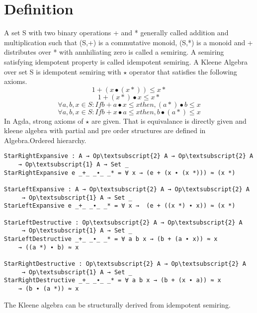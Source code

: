 \section{Definition}
A set S with two binary operations + and * generally called addition and multiplication such that (S,+) is a commutative monoid, (S,*) is a monoid and + distributes over * with annhiliating zero is called a semiring. A semiring satisfying idempotent property is called idempotent semiring. A Kleene Algebra over set S is idempotent semiring with \( \star \) operator that satisfies the following axioms.
\begin{equation}\label{eq_starrightexpansive}
1 + (x ∙ (x *)) \leq x *
\end{equation}
\begin{equation}\label{eq_starleftexpansive}
1 + (x *) ∙ x \leq x *
\end{equation}
\begin{equation}\label{eq_starleftdestructive}
\forall a, b, x \in S: If b + a  ∙ x \leq x then, (a *)  ∙ b \leq x
\end{equation}
\begin{equation}\label{eq_starrightdestructive}
\forall a, b, x \in S: If b + x  ∙ a \leq x then, b  ∙ (a *) \leq x
\end{equation}
In Agda, strong axioms of \(\star\) are given. That is equivalance is directly given and kleene algebra with partial and pre order structures are defined in Algebra.Ordered hierarchy. 
\begin{Verbatim}[commandchars=\\\{\},samepage=true]
StarRightExpansive : A → Op\textsubscript{2} A → Op\textsubscript{2} A 
	→ Op\textsubscript{1} A → Set _
StarRightExpansive e _+_ _∙_ _* = ∀ x → (e + (x ∙ (x *))) ≈ (x *)

StarLeftExpansive : A → Op\textsubscript{2} A → Op\textsubscript{2} A
	 → Op\textsubscript{1} A → Set _
StarLeftExpansive e _+_ _∙_ _* = ∀ x →  (e + ((x *) ∙ x)) ≈ (x *)

StarLeftDestructive : Op\textsubscript{2} A → Op\textsubscript{2} A
	 → Op\textsubscript{1} A → Set _
StarLeftDestructive _+_ _∙_ _* = ∀ a b x → (b + (a ∙ x)) ≈ x 
	→ ((a *) ∙ b) ≈ x

StarRightDestructive : Op\textsubscript{2} A → Op\textsubscript{2} A
	 → Op\textsubscript{1} A → Set _
StarRightDestructive _+_ _∙_ _* = ∀ a b x → (b + (x ∙ a)) ≈ x 
	→ (b ∙ (a *)) ≈ x
\end{Verbatim}
The Kleene algebra can be structurally derived from idempotent semiring. 
